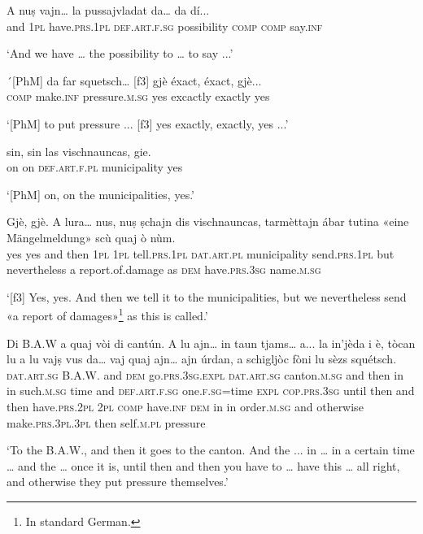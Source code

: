 \begin{linenumbers}
\gll  A nuṣ vajn… la pussajvladat da… da dí...  \\
and \textsc{1pl} have.\textsc{prs.1pl} \textsc{def.art.f.sg} possibility \textsc{comp}  \textsc{comp} say.\textsc{inf}   \\
\end{linenumbers}
\medskip
\glt `And we have … the possibility to … to say ...'
\medskip

\begin{linenumbers}
\gll ´[PhM] da far squetsch… [f3] gjè éxact, éxact, gjè...  \\
\textsc{} \textsc{comp} make.\textsc{inf} pressure.\textsc{m.sg} \textsc{} yes excactly exactly yes \\
\end{linenumbers}
\medskip
\glt `[PhM] to put pressure ... [f3] yes exactly, exactly, yes ...'
\medskip

\begin{linenumbers}
\gll sin, sin las vischnauncas, gie.   \\
on on \textsc{def.art.f.pl} municipality yes\\
\end{linenumbers}
\medskip
\glt `[PhM] on, on the municipalities, yes.'
\medskip

\begin{linenumbers}
\gll  [f3] Gjè, gjè. A lura… nus, nuṣ ṣchajn dis vischnauncas, tarmèttajn ábar tutina «eine Mängelmeldung» scù quaj ò nùm.  \\
\textsc{} yes yes and then \textsc{1pl} \textsc{1pl} tell.\textsc{prs.1pl} \textsc{dat.art.pl} municipality send.\textsc{prs.1pl} but nevertheless a report.of.damage as \textsc{dem} have.\textsc{prs.3sg} name.\textsc{m.sg}  \\
\end{linenumbers}
\medskip
\glt `[f3] Yes, yes. And then we tell it to the municipalities, but we nevertheless send «a report of damages»\footnote{In standard German.} as this is called.'
\medskip

\begin{linenumbers} 
\gll  Di B.A.W a quaj vòi di cantún. A lu ajn… in taun tjams… a... la in’jèda i è, tòcan lu a lu vajṣ vus da… vaj quaj ajn… ajn úrdan, a schigljòc fòni lu sèzs squétsch.  \\
\textsc{dat.art.sg} B.A.W. and \textsc{dem} go.\textsc{prs.3sg.expl}   \textsc{dat.art.sg} canton.\textsc{m.sg} and then in in such.\textsc{m.sg} time and  \textsc{def.art.f.sg}  one.\textsc{f.sg}=time \textsc{expl} \textsc{cop.prs.3sg} until then and then have.\textsc{prs.2pl}  \textsc{2pl} \textsc{comp} have.\textsc{inf} \textsc{dem} in in order.\textsc{m.sg} and otherwise make.\textsc{prs.3pl.3pl} then self.\textsc{m.pl} pressure\\
\end{linenumbers}
\medskip
\glt `To the B.A.W., and then it goes to the canton. And the ... in … in a certain time … and the … once it is, until then and then you have to … have this … all right, and otherwise they put pressure themselves.'
\medskip

